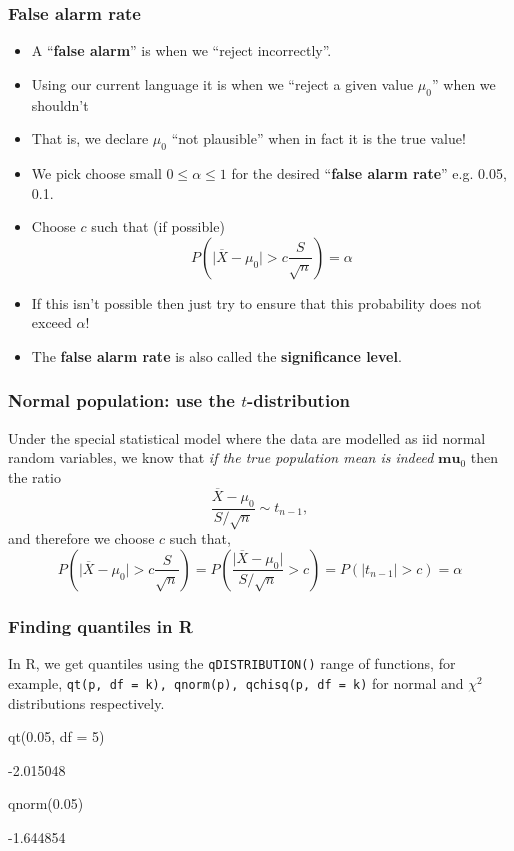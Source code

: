 \documentclass[a4paper]{article}\usepackage[]{graphicx}\usepackage[]{xcolor}
\begin{document}
\subsubsection{False alarm rate}
\begin{itemize}
	\item A ``\textcolor{mygreen}{\textbf{false alarm}}'' is when we ``reject incorrectly''.
	\item Using our current language it is when we ``reject a given value \( \mu_0 \)'' when we shouldn't
	\item That is, we declare \( \mu_0 \) ``not plausible'' when in fact it is the true value!
	\item We pick choose small \( 0 \leq \alpha \leq 1 \) for the desired ``\textcolor{mygreen}{\textbf{false alarm rate}}'' e.g. 0.05, 0.1.
	\item Choose \( c \) such that (if possible)
	\[
		P \left( \lvert \overline{X} - \mu_0 \rvert > c \frac{S}{\sqrt{n}} \right) = \alpha
	\]
	\item If this isn't possible then just try to ensure that this probability does not exceed \( \alpha \)!
	\item The \textcolor{mygreen}{\textbf{false alarm rate}} is also called the \textcolor{mygreen}{\textbf{significance level}}. 
\end{itemize}
\subsubsection{Normal population: use the \( t \)-distribution}
Under the special statistical model where the data are modelled as \textcolor{mygreen}{iid normal random variables}, we know that \textit{if the true population mean is indeed} \( \symbf{mu}_0 \) then the ratio
\[
	\frac{\overline{X} - \mu_0}{S / \sqrt{n}} \sim t_{n-1},
\]
and therefore we choose \( c \) such that,
\[
	P \left( \lvert \overline{X} - \mu_0 \rvert > c \frac{S}{\sqrt{n}} \right) = P \left( \frac{\lvert \overline{X} - \mu_0 \rvert}{S / \sqrt{n}} > c \right) = P(\lvert t_{n-1} \rvert > c) = \alpha
\]
\subsubsection{Finding quantiles in R}
In R, we get quantiles using the \lstinline|qDISTRIBUTION()| range of functions, for example, \lstinline|qt(p, df = k), qnorm(p), qchisq(p, df = k)| for normal and \( \chi^2 \)  distributions respectively.
\begin{Schunk}
\begin{Sinput}
qt(0.05, df = 5)
\end{Sinput}
\begin{Soutput}
[1] -2.015048
\end{Soutput}
\begin{Sinput}
qnorm(0.05)
\end{Sinput}
\begin{Soutput}
[1] -1.644854
\end{Soutput}
\end{Schunk}
\end{document}

